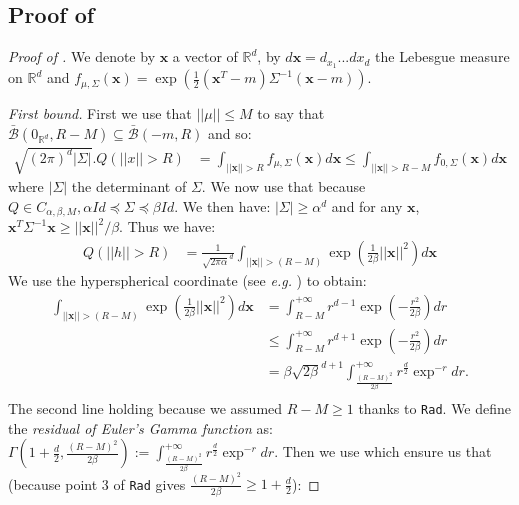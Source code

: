 \begin{noaddcontents}
\subsection{Proof of }
\label{sec: proof_gaussian_tail}

\begin{proof}[Proof of ]
We denote by $\mathbf{x}$ a vector of $\mathbb{R}^d$, by $d\mathbf{x}= d_{x_1}...dx_{d}$ the Lebesgue measure on $\mathbb{R}^d$ and $f_{\mu,\Sigma}(\mathbf{x})= \exp\left(\frac{1}{2}(\mathbf{x}^T-m) \Sigma^{-1} (\mathbf{x}-m)  \right)$.

\textit{First bound.}
First we use that $||\mu||\leq M$ to say that $\bar{\mathcal{B}}(0_{\mathbb{R}^d}, R-M) \subseteq \bar{\mathcal{B}}(-m, R) $ and so:
\begin{align*}
\sqrt{(2 \pi)^d|\Sigma|}.Q(||x||> R) & = \int_{||\mathbf{x}||> R} f_{\mu,\Sigma}(\mathbf{x})d\mathbf{x} \leq  \int_{||\mathbf{x}||> R- M} f_{0,\Sigma}(\mathbf{x})d\mathbf{x}
\end{align*}
where $ |\Sigma|$ the determinant of $\Sigma$.
We now use that because $Q\in C_{\alpha,\beta, M}, \alpha Id \preceq \Sigma \preceq \beta Id$. We then have: $|\Sigma|\geq \alpha^d$ and for any $\mathbf{x}$, $\mathbf{x}^T \Sigma^{-1} \mathbf{x} \geq ||\mathbf{x}||^2/\beta.$
Thus we have:
\begin{align*}
Q(||h||>R) & = \frac{1}{\sqrt{2 \pi\alpha}^{d}}\int_{||\mathbf{x}||>(R-M)} \exp\left(\frac{1}{2\beta}||\mathbf{x}||^2  \right) d \mathbf{x}
\end{align*}
We use the hyperspherical coordinate (see \emph{e.g.} \citealp{blumenson1960derivation}) to obtain:
\begin{align*}
\int_{||\mathbf{x}||>(R-M)} \exp\left(\frac{1}{2\beta}||\mathbf{x}||^2  \right) d \mathbf{x} &= \int_{R-M}^{+\infty} r^{d-1} \exp\left(- \frac{r^2}{2\beta}\right)dr\\
& \leq \int_{R-M}^{+\infty} r^{d+1} \exp\left(- \frac{r^2}{2\beta}\right)dr \\
&= \beta\sqrt{2\beta}^{d+1} \int_{\frac{(R-M)^2}{2\beta}}^{+\infty} r^{\frac{d}{2}} \exp^{-r}dr.\\
\end{align*}
The second line holding because we assumed $R-M\geq 1$ thanks to \texttt{Rad}. We define the \emph{residual of Euler's Gamma function} as:   $\Gamma\left(1+\frac{d}{2}, \frac{(R-M)^2}{2\beta}\right):= \int_{\frac{(R-M)^2}{2\beta}}^{+\infty} r^{\frac{d}{2}} \exp^{-r}dr$.
Then we use \citet[Lemma 4.4.3, p.84]{gabcke1979neue} which ensure us that (because point 3 of \texttt{Rad} gives $\frac{(R-M)^2}{2\beta}\geq 1+\frac{d}{2}$):

\end{proof}
\end{noaddcontents}
